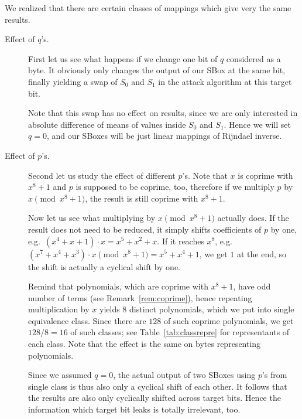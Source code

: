 \begin{remark}
\label{rem:pqeffect}
	We realized that there are certain classes of mappings which give very the same results.
	\begin{description}
		\item[Effect of $q$'s.]
			First let us see what happens if we change one bit of $q$ considered as a byte. It obviously only changes the output of our SBox at the same bit, finally yielding a swap of $S_0$ and $S_1$ in the attack algorithm at this target bit.
			
			Note that this swap has no effect on results, since we are only interested in absolute difference of means of values inside $S_0$ and $S_1$. Hence we will set $q = 0$, and our SBoxes will be just linear mappings of Rijndael inverse.
		
		\item[Effect of $p$'s.]
			Second let us study the effect of different $p$'s. Note that $x$ is coprime with $x^8+1$ and $p$ is supposed to be coprime, too, therefore if we multiply $p$ by $x\pmod{x^8+1}$, the result is still coprime with $x^8+1$.
			
			Now let us see what multiplying by $x\pmod{x^8+1}$ actually does. If the result does not need to be reduced, it simply shifts coefficients of $p$ by one, e.g.\ $(x^4 + x + 1) \cdot x = x^5 + x^2 + x$. If it reaches $x^8$, e.g.\ $(x^7 + x^4 + x^3) \cdot x \pmod{x^8+1} = x^5 + x^4 + 1$, we get $1$ at the end, so the shift is actually a cyclical shift by one.
			
			Remind that polynomials, which are coprime with $x^8+1$, have odd number of terms (see Remark~\ref{rem:coprime}), hence repeating multiplication by $x$ yields $8$ distinct polynomials, which we put into single equivalence class. Since there are $128$ of such coprime polynomials, we get $128/8=16$ of such classes; see Table~\ref{tab:classrepre} for representants of each class. Note that the effect is the same on bytes representing polynomials.
			
			Since we assumed $q = 0$, the actual output of two SBoxes using $p$'s from single class is thus also only a cyclical shift of each other. It follows that the results are also only cyclically shifted across target bits. Hence the information which target bit leaks is totally irrelevant, too.
	\end{description}
\end{remark}

